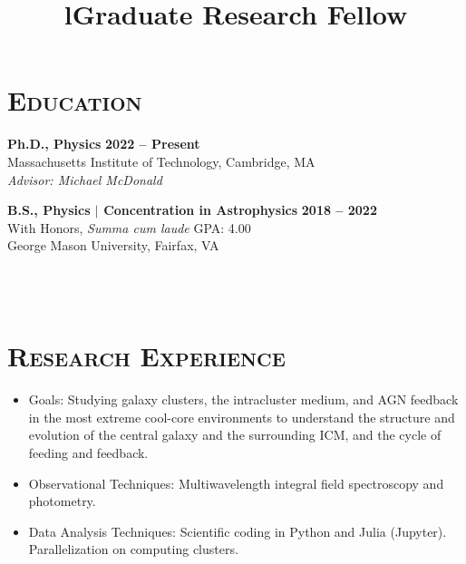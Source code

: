 \documentclass[marg, centered]{res}
\newcommand{\CVItem}[1]{
  \item\small{
    {#1 \vspace{-2pt}}
  }
}
\begin{document}
\begin{resume}

\section{{\scshape \bfseries Education}}
\textbf{Ph.D., Physics} \hfill {\bf 2022 -- Present} \\
Massachusetts Institute of Technology, Cambridge, MA \\
{\em Advisor: Michael McDonald} \\
\vspace{-0.7cm}

\textbf{B.S., Physics $\mathbf{|}$ Concentration in Astrophysics} \hfill {\bf 2018 -- 2022}\\
With Honors, \textit{Summa cum laude} \hfill GPA: 4.00 \\
George Mason University, Fairfax, VA

\begin{format}
\title{l}\\
\\
\body
\end{format}

\section{{\scshape \bfseries Research Experience}}
\title{\textbf{Graduate Research Fellow}}
\begin{position}
\vspace{-0.35cm}
\begin{itemize}
    \CVItem{Goals: Studying galaxy clusters, the intracluster medium, and AGN feedback in the most extreme cool-core environments to understand the structure and evolution of the central galaxy and the surrounding ICM, and the cycle of feeding and feedback.}
    \CVItem{Observational Techniques: Multiwavelength integral field spectroscopy and photometry.}
    \CVItem{Data Analysis Techniques: Scientific coding in Python and Julia (Jupyter). Parallelization on computing clusters.}
\end{itemize}
\end{position}


\end{resume}
\end{document}
